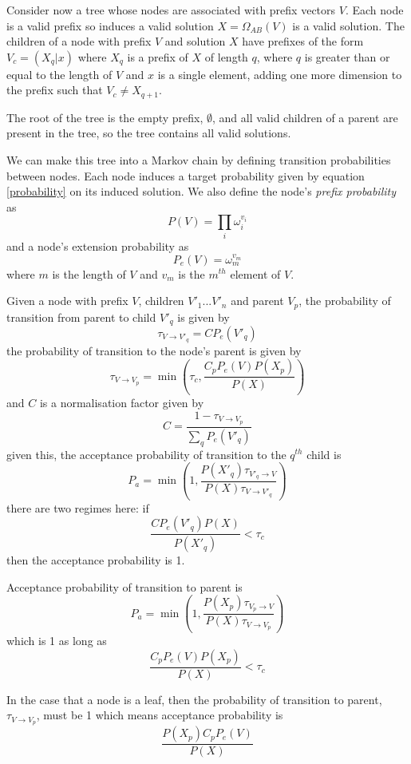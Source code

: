 \documentclass{article}
\begin{document}
Consider now a tree whose nodes are associated with prefix vectors $V$. Each node is a valid prefix so induces a valid solution $X = \Omega_{AB}(V)$ is a valid solution. The children of a node with prefix $V$ and solution $X$ have prefixes of the form $V_c = (X_q|x)$ where $X_q$ is a prefix of $X$ of length $q$, where $q$ is greater than or equal to the length of $V$ and $x$ is a single element, adding one more dimension to the prefix such that $V_c \ne X_{q+1}$.

The root of the tree is the empty prefix, $\emptyset$, and all valid children of a parent are present in the tree, so the tree contains all valid solutions.

We can make this tree into a Markov chain by defining transition probabilities between nodes. Each node induces a target probability given by equation \ref{probability} on its induced solution. We also define the node's \textit{prefix probability} as 
\[
P(V) = \prod_i \omega_i^{v_i}
\]
and a node's extension probability as
\[
P_e(V) = \omega_m^{v_m}
\]
where $m$ is the length of $V$ and $v_m$ is the $m^{th}$ element of $V$.

Given a node with prefix $V$, children $V'_1...V'_n$ and parent $V_p$, the probability of transition from parent to child $V'_q$ is given by
\[
\tau_{V\rightarrow V'_q} = CP_e(V'_q)
\]
the probability of transition to the node's parent is given by
\[
\tau_{V\rightarrow V_p} = \min\left(\tau_c, \frac{C_pP_e(V)P(X_p)}{P(X)}\right)
\]
and $C$ is a normalisation factor given by
\[
C =  \frac{1 - \tau_{V\rightarrow V_p}}{\sum_q P_e(V'_q)}
\]
given this, the acceptance probability of transition to the $q^{th}$ child is
\[
P_a = \min\left(1, \frac{P(X'_q)\tau_{V'_q\rightarrow V}}{P(X)\tau_{V\rightarrow V'_q}}\right)
\]
there are two regimes here: if
\[
\frac{CP_e(V'_q)P(X)}{P(X'_q)} < \tau_c 
\]
then the acceptance probability is 1.

Acceptance probability of transition to parent is
\[
P_a = \min\left(1, \frac{P(X_p)\tau_{V_p\rightarrow V}}{P(X)\tau_{V\rightarrow V_p}}\right)
\]
which is 1 as long as
\[
\frac{C_pP_e(V)P(X_p)}{P(X)} < \tau_c
\]

In the case that a node is a leaf, then the probability of transition to parent, $\tau_{V\rightarrow V_p}$, must be 1 which means acceptance probability is
\[
\frac{P(X_p)C_pP_e(V)}{P(X)}
\]

%
% 


\end{document}

